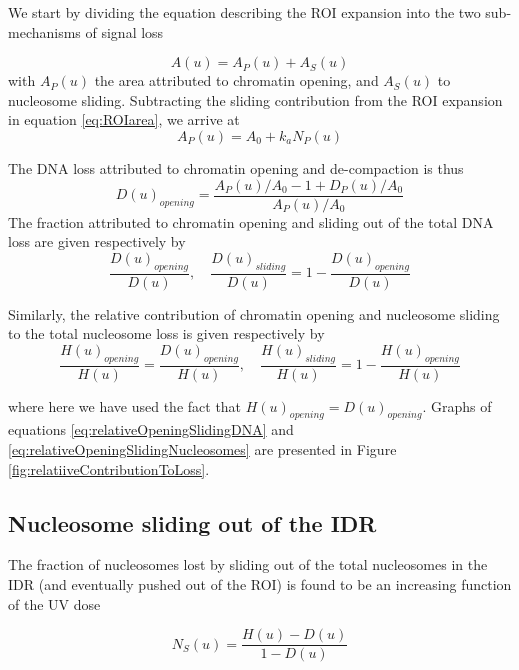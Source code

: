 \documentclass[12pt]{article}
\begin{document}
We start by dividing the equation describing the ROI expansion into the
two sub-mechanisms of signal loss

\begin{equation*}
A(u) = A_P(u) +A_S(u)
\end{equation*}
with $A_P(u)$ the area attributed to chromatin opening, and $A_S(u)$ to nucleosome sliding. Subtracting the sliding contribution from the ROI expansion
in equation \eqref{eq:ROIarea}, we arrive at
\begin{equation*}
A_P(u) = A_0 + k_aN_P(u)
\end{equation*}

The DNA loss attributed to chromatin opening and de-compaction is thus
\begin{equation*}
D(u)_{opening}= \frac{A_P(u)/A_0 -1 +D_P(u)/A_0}{A_P(u)/A_0}
\end{equation*}	
The fraction attributed to chromatin opening and sliding out of the total
DNA loss are given respectively by
\begin{equation}\label{eq:relativeOpeningSlidingDNA}
\frac{D(u)_{opening}}{D(u)}, \quad \frac{D(u)_{sliding}}{D(u)}=1-\frac{D(u)_{opening}}{D(u)}
\end{equation}

Similarly, the relative contribution of chromatin opening and nucleosome
sliding to the total nucleosome loss is given respectively by
\begin{equation}\label{eq:relativeOpeningSlidingNucleosomes}
\frac{H(u)_{opening}}{H(u)} = \frac{D(u)_{opening}}{H(u)},\quad \frac{H(u)_{sliding}}{H(u)}=1-\frac{H(u)_{opening}}{H(u)}
\end{equation}

where here we have used the fact that $H(u)_{opening} = D(u)_{opening}$. Graphs of
equations \eqref{eq:relativeOpeningSlidingDNA} and \eqref{eq:relativeOpeningSlidingNucleosomes}  are presented in Figure \ref{fig:relatiiveContributionToLoss}.

\subsection{Nucleosome sliding out of the IDR}
The fraction of nucleosomes lost by sliding out of the total nucleosomes in the IDR
(and eventually pushed out of the ROI) is found to be an increasing function
of the UV dose

\begin{equation*}
N_S(u) = \frac{H(u)-D(u)}{1-D(u)}
\end{equation*}
\end{document}
